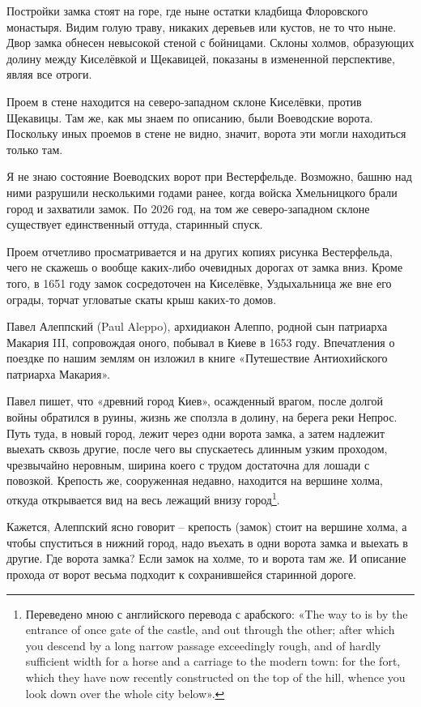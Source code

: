 Постройки замка стоят на горе, где ныне остатки кладбища Флоровского монастыря. Видим голую траву, никаких деревьев или кустов, не то что ныне. Двор замка обнесен невысокой стеной с бойницами. Склоны холмов, образующих долину между Киселёвкой и Щекавицей, показаны в измененной перспективе, являя все отроги. 

Проем в стене находится на северо-западном склоне Киселёвки, против Щекавицы. Там же, как мы знаем по описанию, были Воеводские ворота. Поскольку иных проемов в стене не видно, значит, ворота эти могли находиться только там.

Я не знаю состояние Воеводских ворот при Вестерфельде. Возможно, башню над ними разрушили несколькими годами ранее, когда войска Хмельницкого брали город и захватили замок. По 2026 год, на том же северо-западном склоне существует единственный оттуда, старинный спуск.

Проем отчетливо просматривается и на других копиях рисунка Вестерфельда, чего не скажешь о вообще каких-либо очевидных дорогах от замка вниз. Кроме того, в 1651 году замок сосредоточен на Киселёвке, Уздыхальница же вне его ограды, торчат угловатые скаты крыш каких-то домов.

Павел Алеппский (Paul Aleppo), архидиакон Алеппо, родной сын патриарха Макария III, сопровождая оного, побывал в Киеве в 1653 году. Впечатления о поездке по нашим землям он изложил в книге «Путешествие Антиохийского патриарха Макария»\cite{alepp02}. 

Павел пишет, что «древний город Киев», осажденный врагом, после долгой войны обратился в руины, жизнь же сползла в долину, на берега реки Непрос. Путь туда, в новый город, лежит через одни ворота замка, а затем надлежит выехать сквозь другие, после чего вы спускаетесь длинным узким проходом, чрезвычайно неровным, ширина коего с трудом достаточна для лошади с повозкой. Крепость же, сооруженная недавно, находится на вершине холма, откуда открывается вид на весь лежащий внизу город\footnote{Переведено мною с английского перевода с арабского: «The way to is by the entrance of once gate of the castle, and out through the other; after which you descend by a long narrow passage exceedingly rough, and of hardly sufficient width for a horse and a carriage to the modern town: for the fort, which they have now recently constructed on the top of the hill, whence you look down over the whole city below».}.

Кажется, Алеппский ясно говорит – крепость (замок) стоит на вершине холма, а чтобы спуститься в нижний город, надо въехать в одни ворота замка и выехать в другие. Где ворота замка? Если замок на холме, то и ворота там же. И описание прохода от ворот весьма подходит к сохранившейся старинной дороге.


